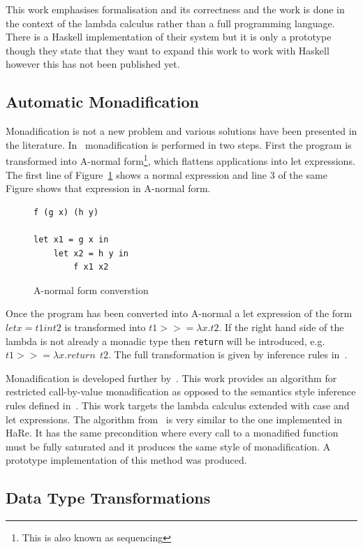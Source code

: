 This work emphasises formalisation and its correctness and the work is done in the context of the lambda calculus rather than a full programming language. There is a Haskell implementation of their system but it is only a prototype though they state that they want to expand this work to work with Haskell however this has not been published yet.

\subsection{Automatic Monadification}\label{erwigMonad}

Monadification is not a new problem and various solutions have been presented in the literature. In~\citep{lammelReuse} monadification is performed in two steps. First the program is transformed into A-normal form\footnote{This is also known as sequencing}, which flattens applications into let expressions. The first line of Figure~\ref{anormal} shows a normal expression and line 3 of the same Figure shows that expression in A-normal form.

\begin{figure}[t]
\begin{lstlisting}
f (g x) (h y)

let x1 = g x in
	let x2 = h y in
		f x1 x2
\end{lstlisting}
\caption{A-normal form converstion}
\label{anormal}
\end{figure}

Once the program has been converted into A-normal a let expression of the form $ let x = t1 in t2 $ is transformed into $ t1 >>= \lambda x. t2 $. If the right hand side of the lambda is not already a monadic type then \texttt{return} will be introduced, e.g. $ t1 >>= \lambda x. return~~t2 $. The full transformation is given by inference rules in~\citep{lammelReuse}.

Monadification is developed further by~\citep{monadification}. This work provides an algorithm for restricted call-by-value monadification as opposed to the semantics style inference rules defined in~\citep{lammelReuse}. This work targets the lambda calculus extended with case and let expressions. The algorithm from~\citep{monadification} is very similar to the one implemented in HaRe. It has the same precondition where every call to a monadified function must be fully saturated and it produces the same style of monadification. A prototype implementation of this method was produced.

\subsection{Data Type Transformations}\label{dtt}

